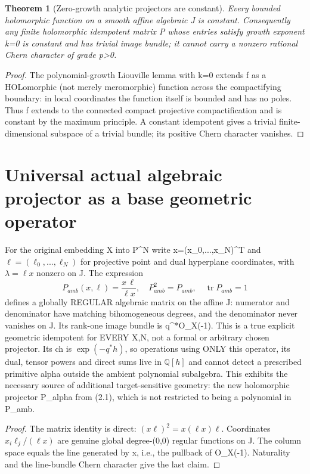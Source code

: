 \documentclass[11pt]{article}
\newtheorem{theorem}{Theorem}[section]
\begin{document}
\begin{theorem}[Zero-growth analytic projectors are constant]
Every bounded holomorphic function on
a smooth affine algebraic J is constant.
Consequently any finite holomorphic
idempotent matrix P whose entries
satisfy growth exponent k=0 is
constant and has trivial image
bundle; it cannot carry a nonzero
rational Chern character of grade p>0.
\end{theorem}
\begin{proof}
The polynomial-growth Liouville
lemma with k=0 extends f as a
HOLomorphic (not merely meromorphic)
function across the compactifying
boundary: in local coordinates
the function itself is bounded and
has no poles. Thus f extends to
the connected compact projective
compactification and is constant
by the maximum principle.
A constant idempotent gives a
trivial finite-dimensional subspace
of a trivial bundle; its positive
Chern character vanishes.
\end{proof}

\section{Universal actual algebraic projector as a base geometric operator}
For the original embedding X into P^N
write x=(x_0,...,x_N)^T and
$\ell=(\ell_0,...,\ell_N)$
for projective point and dual hyperplane
coordinates, with $\lambda=\ell x$
nonzero on J. The expression
\[
 \boxed{
  P_{amb}(x,\ell)=\frac{x\,\ell}{\ell x},
  \quad P_{amb}^2=P_{amb},
  \quad\operatorname{tr}P_{amb}=1
 }                                                       \tag{8.1}
\]
defines a globally REGULAR algebraic
matrix on the affine J: numerator
and denominator have matching
bihomogeneous degrees, and the
denominator never vanishes on J.
Its rank-one image bundle is q^*O_X(-1).
This is a true explicit geometric
idempotent for EVERY X,N, not a
formal or arbitrary chosen projector.
Its ch is $\exp(-q^*h)$, so
operations using ONLY this operator,
its dual, tensor powers and direct
sums live in $\mathbb Q[h]$ and
cannot detect a prescribed primitive
alpha outside the ambient polynomial
subalgebra. This exhibits the
necessary source of additional
target-sensitive geometry:
the new holomorphic projector P_alpha
from (2.1), which is not restricted
to being a polynomial in P_amb.
\begin{proof}
The matrix identity is direct:
$(x\ell)^2=x(\ell x)\ell$.
Coordinates $x_i\ell_j/(\ell x)$
are genuine global degree-(0,0)
regular functions on J. The column
space equals the line generated by x,
i.e., the pullback of O_X(-1).
Naturality and the line-bundle
Chern character give the last claim.
\end{proof}
\end{document}
